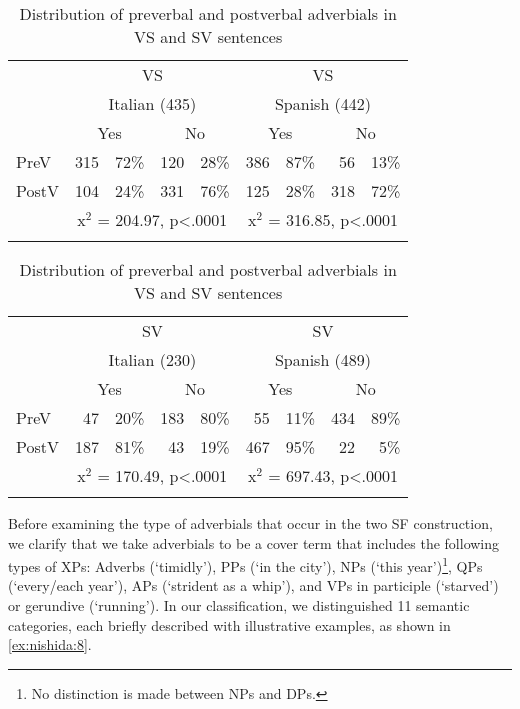 \documentclass[output=paper,colorlinks,citecolor=brown,
]{langscibook}
\begin{document}
\begin{table}
    \begin{tabular}{lrrrrrrrr}\lsptoprule
    & \multicolumn{4}{c}{VS} & \multicolumn{4}{c}{VS} \\
    & \multicolumn{4}{c}{Italian (435)} & \multicolumn{4}{c}{Spanish (442)} \\\midrule
    & \multicolumn{2}{c}{Yes} & \multicolumn{2}{c}{No} & \multicolumn{2}{c}{Yes} & \multicolumn{2}{c}{No} \\
   PreV & 315 & 72\% & 120 & 28\% & 386 & 87\% & 56 & 13\%\\
PostV & 104 & 24\% & 331 & 76\% & 125 & 28\% & 318 & 72\% \\
& \multicolumn{4}{c}{x$^2$ = 204.97, p<.0001} & \multicolumn{4}{c}{x$^2$ = 316.85, p<.0001}\\
    \lspbottomrule
    \end{tabular}
    \begin{tabular}{lrrrrrrrr}\lsptoprule
         & \multicolumn{4}{c}{SV} & \multicolumn{4}{c}{SV} \\
         & \multicolumn{4}{c}{Italian (230)} & \multicolumn{4}{c}{Spanish (489)}\\\midrule
         & \multicolumn{2}{c}{Yes} & \multicolumn{2}{c}{No} & \multicolumn{2}{c}{Yes} & \multicolumn{2}{c}{No} \\
         PreV & 47 & 20\% & 183 & 80\% & 55 & 11\% & 434 & 89\%\\
         PostV & 187 & 81\% & 43 & 19\% & 467 & 95\% & 22 & 5\%\\
         & \multicolumn{4}{c}{x$^2$ = 170.49, p<.0001} & \multicolumn{4}{c}{x$^2$ = 697.43, p<.0001}\\
    \lspbottomrule
    \end{tabular}
\caption{Distribution of preverbal and postverbal adverbials in VS and SV sentences}
\label{tab:nishida:4}
\end{table}

Before examining the type of adverbials that occur in the two SF construction, we clarify that we take adverbials to be a cover term that includes the following types of XPs: Adverbs (`timidly'), PPs (`in the city'), NPs (`this year')\footnote{No distinction is made between NPs and DPs.}, QPs (`every/each year'), APs (`strident as a whip'), and VPs in participle (`starved') or gerundive (`running'). In our classification, we distinguished 11 semantic categories, each briefly described with illustrative examples, as shown in \ref{ex:nishida:8}. 
\end{document}
